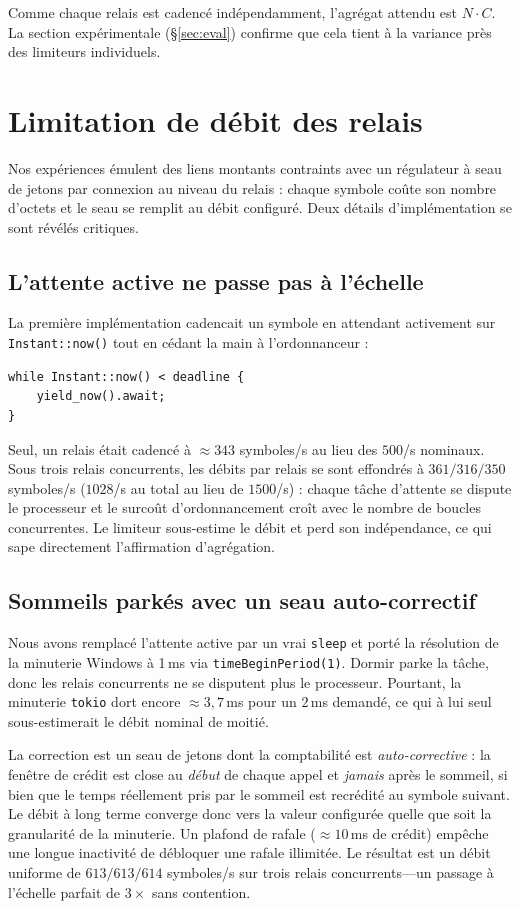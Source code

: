 \documentclass[conference]{IEEEtran}
\begin{document}
Comme chaque relais est cadencé indépendamment, l'agrégat attendu est $N\cdot
C$. La section expérimentale (\S\ref{sec:eval}) confirme que cela tient à la
variance près des limiteurs individuels.

\section{Limitation de débit des relais}
\label{sec:throttle}

Nos expériences émulent des liens montants contraints avec un régulateur à seau
de jetons par connexion au niveau du relais : chaque symbole coûte son nombre
d'octets et le seau se remplit au débit configuré. Deux détails
d'implémentation se sont révélés critiques.

\subsection{L'attente active ne passe pas à l'échelle}
La première implémentation cadencait un symbole en attendant activement sur
\texttt{Instant::now()} tout en cédant la main à l'ordonnanceur :
\begin{verbatim}
while Instant::now() < deadline {
    yield_now().await;
}
\end{verbatim}
Seul, un relais était cadencé à $\approx 343$ symboles/s au lieu des $500$/s
nominaux. Sous trois relais concurrents, les débits par relais se sont
effondrés à $361/316/350$ symboles/s ($1028$/s au total au lieu de $1500$/s) :
chaque tâche d'attente se dispute le processeur et le surcoût d'ordonnancement
croît avec le nombre de boucles concurrentes. Le limiteur sous-estime le débit
et perd son indépendance, ce qui sape directement l'affirmation d'agrégation.

\subsection{Sommeils parkés avec un seau auto-correctif}
Nous avons remplacé l'attente active par un vrai \texttt{sleep} et porté la
résolution de la minuterie Windows à 1\,ms via \texttt{timeBeginPeriod(1)}.
Dormir parke la tâche, donc les relais concurrents ne se disputent plus le
processeur. Pourtant, la minuterie \texttt{tokio} dort encore $\approx 3{,}7$\,ms
pour un $2$\,ms demandé, ce qui à lui seul sous-estimerait le débit nominal de
moitié.

La correction est un seau de jetons dont la comptabilité est
\emph{auto-corrective} : la fenêtre de crédit est close au \emph{début} de
chaque appel et \emph{jamais} après le sommeil, si bien que le temps réellement
pris par le sommeil est recrédité au symbole suivant. Le débit à long terme
converge donc vers la valeur configurée quelle que soit la granularité de la
minuterie. Un plafond de rafale ($\approx 10$\,ms de crédit) empêche une longue
inactivité de débloquer une rafale illimitée. Le résultat est un débit uniforme
de $613/613/614$ symboles/s sur trois relais concurrents---un passage à
l'échelle parfait de $3\times$ sans contention.
\end{document}
